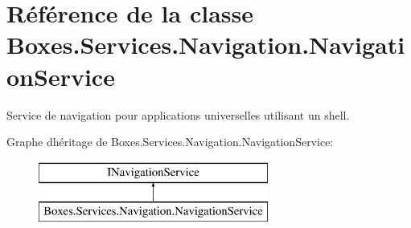 \hypertarget{class_boxes_1_1_services_1_1_navigation_1_1_navigation_service}{}\section{Référence de la classe Boxes.\+Services.\+Navigation.\+Navigation\+Service}
\label{class_boxes_1_1_services_1_1_navigation_1_1_navigation_service}


Service de navigation pour applications universelles utilisant un shell.  


Graphe d\textquotesingle{}héritage de Boxes.\+Services.\+Navigation.\+Navigation\+Service\+:\begin{figure}[H]
\begin{center}
\leavevmode
\includegraphics[height=2.000000cm]{class_boxes_1_1_services_1_1_navigation_1_1_navigation_service}
\end{center}
\end{figure}
